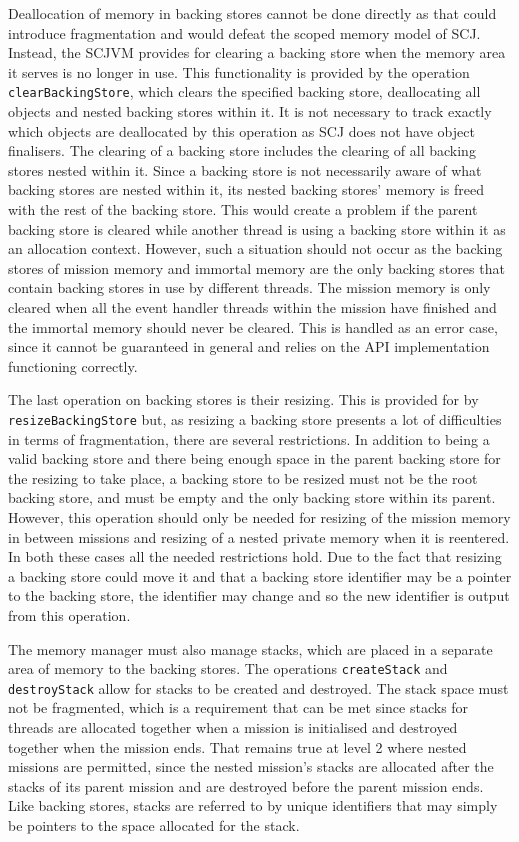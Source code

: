 \documentclass[a4paper,10pt]{report}
\begin{document}
Deallocation of memory in backing stores cannot be done directly as
that could introduce fragmentation and would defeat the scoped memory
model of SCJ.
Instead, the SCJVM provides for clearing a backing store when the
memory area it serves is no longer in use.
This functionality is provided by the operation
\texttt{clear\-Backing\-Store}, which clears the specified backing
store, deallocating all objects and nested backing stores within it.
It is not necessary to track exactly which objects are deallocated by
this operation as SCJ does not have object finalisers.
The clearing of a backing store includes the clearing of all backing
stores nested within it.
Since a backing store is not necessarily aware of what backing stores
are nested within it, its nested backing stores' memory is freed with
the rest of the backing store.
This would create a problem if the parent backing store is cleared
while another thread is using a backing store within it as an
allocation context.
However, such a situation should not occur as the backing stores of
mission memory and immortal memory are the only backing stores that
contain backing stores in use by different threads.
The mission memory is only cleared when all the event handler threads
within the mission have finished and the immortal memory should never
be cleared.
This is handled as an error case, since it cannot be guaranteed in
general and relies on the API implementation functioning correctly.

The last operation on backing stores is their resizing.
This is provided for by \texttt{resize\-Backing\-Store} but, as
resizing a backing store presents a lot of difficulties in terms of
fragmentation, there are several restrictions.
In addition to being a valid backing store and there being enough
space in the parent backing store for the resizing to take place, a
backing store to be resized must not be the root backing store, and
must be empty and the only backing store within its parent.
However, this operation should only be needed for resizing of the
mission memory in between missions and resizing of a nested private
memory when it is reentered.
In both these cases all the needed restrictions hold.
Due to the fact that resizing a backing store could move it and that a
backing store identifier may be a pointer to the backing store, the
identifier may change and so the new identifier is output from this
operation.

The memory manager must also manage stacks, which are placed in a
separate area of memory to the backing stores.
The operations \texttt{create\-Stack} and \texttt{destroy\-Stack}
allow for stacks to be created and destroyed.
The stack space must not be fragmented, which is a requirement that
can be met since stacks for threads are allocated together when a
mission is initialised and destroyed together when the mission ends.
That remains true at level 2 where nested missions are permitted,
since the nested mission's stacks are allocated after the stacks of
its parent mission and are destroyed before the parent mission ends.
Like backing stores, stacks are referred to by unique identifiers that
may simply be pointers to the space allocated for the stack.
\end{document}
